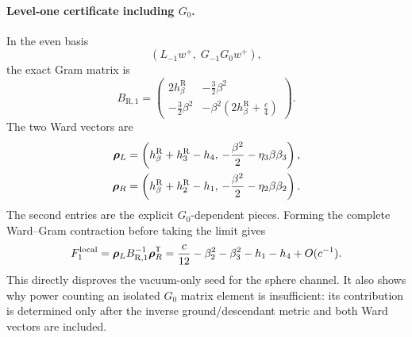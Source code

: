 \documentclass[11pt]{article}
\newcommand{\R}{\mathrm{R}}
\begin{document}
\paragraph{Level-one certificate including \(G_0\).}
In the even basis
\begin{equation}
 \left(L_{-1}w^+,\;G_{-1}G_0w^+\right),
\end{equation}
the exact Gram matrix is
\begin{equation}
 B_{\R,1}
 =
 \begin{pmatrix}
 2h_\beta^{\R}&-\frac32\beta^2\\
 -\frac32\beta^2&
 -\beta^2\left(2h_\beta^{\R}+\frac c4\right)
 \end{pmatrix}.
 \label{eq:fixed-beta-r-level-one-gram}
\end{equation}
The two Ward vectors are
\begin{align}
 \boldsymbol\rho_L
 &=
 \left(
 h_\beta^{\R}+h_3^{\R}-h_4,\,
 -\frac{\beta^2}{2}-\eta_3\beta\beta_3
 \right),
 \notag\\
 \boldsymbol\rho_R
 &=
 \left(
 h_\beta^{\R}+h_2^{\R}-h_1,\,
 -\frac{\beta^2}{2}-\eta_2\beta\beta_2
 \right).
 \label{eq:fixed-beta-r-level-one-ward-vectors}
\end{align}
The second entries are the explicit \(G_0\)-dependent pieces.  Forming the
complete Ward--Gram contraction before taking the limit gives
\begin{equation}
 F_1^{\rm local}
 =
 \boldsymbol\rho_L B_{\R,1}^{-1}\boldsymbol\rho_R^{\mathsf T}
 =
 \frac c{12}
 -\beta_2^2-\beta_3^2-h_1-h_4
 +O(c^{-1}).
 \label{eq:fixed-beta-r-local-level-one-limit}
\end{equation}
This directly disproves the vacuum-only seed for the sphere channel.  It
also shows why power counting an isolated \(G_0\) matrix element is
insufficient: its contribution is determined only after the inverse
ground/descendant metric and both Ward vectors are included.
\end{document}

